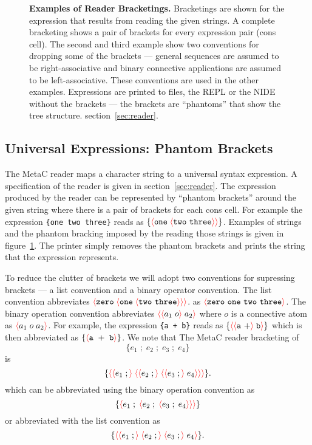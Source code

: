 \documentclass{article}
\newcommand{\mtt}[1]{\mbox{\tt #1}}
\newcommand{\fopen}{{\color{red} \langle}}
\newcommand{\fclose}{{\color{red} \rangle}}
\begin{document}
\begin{figure}
\caption{{\bf Examples of Reader Bracketings.} Bracketings are shown for the expression that results from reading the given strings.
  A complete bracketing shows a pair of brackets for every expression
  pair (cons cell).  The second and third example show two conventions
  for dropping some of the brackets --- general sequences are assumed
  to be right-associative and binary connective applications are
  assumed to be left-associative.  These conventions are used in the
  other examples.  Expressions are printed to files, the REPL or the NIDE without the brackets ---
  the brackets are ``phantoms'' that show the tree structure.
  section~\ref{sec:reader}.}
\label{fig:reader}
\end{figure}

\subsection{Universal Expressions: Phantom Brackets}

The MetaC reader maps a character string to a universal syntax expression.  A specification of the reader is given in section~\ref{sec:reader}.
The expression produced by the reader
can be represented by ``phantom brackets'' around the given string
where there is a pair of brackets for each cons cell.
For example the expression \mtt{\{one two three\}} reads as $\{\fopen \mathtt{one}\;\fopen \mathtt{two~three}\fclose \fclose\}$.
Examples of strings and the phantom bracking imposed by the reading those strings is given in figure~{\ref{fig:reader}}.
The printer simply removes the phantom brackets and prints the string that the expression represents.

To reduce the clutter of brackets we will adopt two conventions for supressing brackets --- a list convention and a binary operator convention.
The list convention abbreviates $\fopen \mathtt{zero}\;\fopen \mathtt{one}\;\fopen \mathtt{two~three}\fclose \fclose \fclose$.
as $\fopen\mathtt{zero~one~two~three}\fclose$.  The binary operation convention abbreviates $\fopen \fopen a_1 \;o\fclose\;a_2\fclose$ where $o$ is a connective atom
as $\fopen a_1\;o\;a_2 \fclose$.  For example, the expression \mtt{\{a + b\}} reads as
$\{\fopen \fopen \mathtt{a~+} \fclose \;\mathtt{b} \fclose \}$ which is then abbreviated as
$\{\fopen \mathtt{a~+~b} \fclose \}$. We note that
The MetaC reader bracketing of
$$\{e_1\;;\;e_2\;;\;e_3\;;\;e_4\}$$
is $$\{\fopen \fopen e_1\;;\fclose \;\fopen \fopen e_2\;;\fclose \;\fopen \fopen e_3\;;\fclose\;e_4\fclose\fclose\fclose\}.$$
which can be abbreviated using the binary operation convention as
$$\{\fopen e_1\;;\;\fopen e_2\;;\;\fopen e_3\;;\;e_4\fclose\fclose\fclose\}$$
or abbreviated with the list convention as
$$\{\fopen \fopen e_1\;;\fclose \;\fopen e_2\;;\fclose \;\fopen e_3\;;\fclose\;e_4\fclose\}.$$
\end{document}
